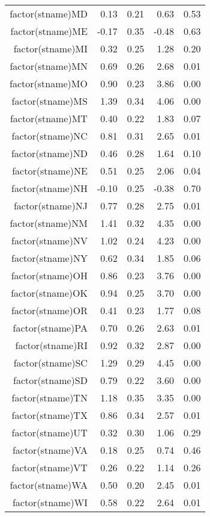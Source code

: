 \begin{table}[ht]
\begin{tabular}{rrrrr}
  factor(stname)MD & 0.13 & 0.21 & 0.63 & 0.53 \\ 
  factor(stname)ME & -0.17 & 0.35 & -0.48 & 0.63 \\ 
  factor(stname)MI & 0.32 & 0.25 & 1.28 & 0.20 \\ 
  factor(stname)MN & 0.69 & 0.26 & 2.68 & 0.01 \\ 
  factor(stname)MO & 0.90 & 0.23 & 3.86 & 0.00 \\ 
  factor(stname)MS & 1.39 & 0.34 & 4.06 & 0.00 \\ 
  factor(stname)MT & 0.40 & 0.22 & 1.83 & 0.07 \\ 
  factor(stname)NC & 0.81 & 0.31 & 2.65 & 0.01 \\ 
  factor(stname)ND & 0.46 & 0.28 & 1.64 & 0.10 \\ 
  factor(stname)NE & 0.51 & 0.25 & 2.06 & 0.04 \\ 
  factor(stname)NH & -0.10 & 0.25 & -0.38 & 0.70 \\ 
  factor(stname)NJ & 0.77 & 0.28 & 2.75 & 0.01 \\ 
  factor(stname)NM & 1.41 & 0.32 & 4.35 & 0.00 \\ 
  factor(stname)NV & 1.02 & 0.24 & 4.23 & 0.00 \\ 
  factor(stname)NY & 0.62 & 0.34 & 1.85 & 0.06 \\ 
  factor(stname)OH & 0.86 & 0.23 & 3.76 & 0.00 \\ 
  factor(stname)OK & 0.94 & 0.25 & 3.70 & 0.00 \\ 
  factor(stname)OR & 0.41 & 0.23 & 1.77 & 0.08 \\ 
  factor(stname)PA & 0.70 & 0.26 & 2.63 & 0.01 \\ 
  factor(stname)RI & 0.92 & 0.32 & 2.87 & 0.00 \\ 
  factor(stname)SC & 1.29 & 0.29 & 4.45 & 0.00 \\ 
  factor(stname)SD & 0.79 & 0.22 & 3.60 & 0.00 \\ 
  factor(stname)TN & 1.18 & 0.35 & 3.35 & 0.00 \\ 
  factor(stname)TX & 0.86 & 0.34 & 2.57 & 0.01 \\ 
  factor(stname)UT & 0.32 & 0.30 & 1.06 & 0.29 \\ 
  factor(stname)VA & 0.18 & 0.25 & 0.74 & 0.46 \\ 
  factor(stname)VT & 0.26 & 0.22 & 1.14 & 0.26 \\ 
  factor(stname)WA & 0.50 & 0.20 & 2.45 & 0.01 \\ 
  factor(stname)WI & 0.58 & 0.22 & 2.64 & 0.01 \\ 

\end{tabular}
\end{table}
